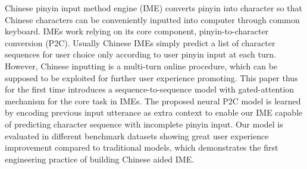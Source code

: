 Chinese pinyin input method engine (IME) converts pinyin into character so that Chinese characters can be conveniently inputted into computer through common keyboard. IMEs work relying on its core component, pinyin-to-character conversion (P2C). Usually Chinese IMEs simply predict a list of character sequences for user choice only according to user pinyin input at each turn. However, Chinese inputting is a multi-turn online procedure, which can be supposed to be exploited for further user experience promoting. This paper thus for the first time introduces a sequence-to-sequence model with gated-attention mechanism for the core task in IMEs. The proposed neural P2C model is learned by encoding previous input utterance as extra context to enable our IME capable of predicting character sequence with incomplete pinyin input. Our model is evaluated in different benchmark datasets showing great user experience improvement compared to traditional models, which demonstrates the first engineering practice of building Chinese aided IME.

